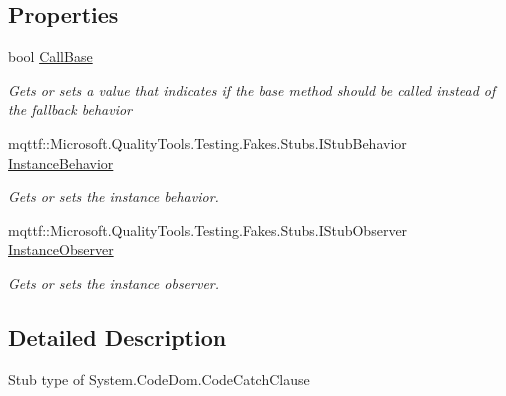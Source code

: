 \subsection*{Properties}
\begin{DoxyCompactItemize}
\item 
bool \hyperlink{class_system_1_1_code_dom_1_1_fakes_1_1_stub_code_catch_clause_ad6571686078880e3ef39653dab9b47f6}{Call\-Base}
\begin{DoxyCompactList}\small\item\em Gets or sets a value that indicates if the base method should be called instead of the fallback behavior\end{DoxyCompactList}\item 
mqttf\-::\-Microsoft.\-Quality\-Tools.\-Testing.\-Fakes.\-Stubs.\-I\-Stub\-Behavior \hyperlink{class_system_1_1_code_dom_1_1_fakes_1_1_stub_code_catch_clause_a5d6f733c4aeb1f6bf047df7f4d0fec48}{Instance\-Behavior}
\begin{DoxyCompactList}\small\item\em Gets or sets the instance behavior.\end{DoxyCompactList}\item 
mqttf\-::\-Microsoft.\-Quality\-Tools.\-Testing.\-Fakes.\-Stubs.\-I\-Stub\-Observer \hyperlink{class_system_1_1_code_dom_1_1_fakes_1_1_stub_code_catch_clause_abbc970da4aa9affdbeb7d01b5bc76836}{Instance\-Observer}
\begin{DoxyCompactList}\small\item\em Gets or sets the instance observer.\end{DoxyCompactList}\end{DoxyCompactItemize}


\subsection{Detailed Description}
Stub type of System.\-Code\-Dom.\-Code\-Catch\-Clause



